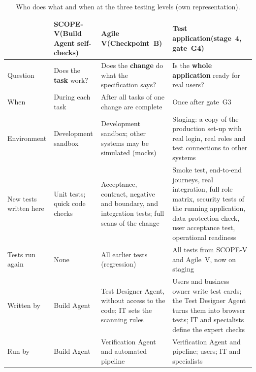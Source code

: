 \documentclass[10pt,a4paper]{article}
\begin{document}
\begin{table}[htbp]
    \centering
    \footnotesize
    \caption{Who does what and when at the three testing levels (own
    representation).}
    \label{tab:app-testing-who-when}
    \begin{tabularx}{\textwidth}{>{\raggedright\arraybackslash}p{2.4cm} Y Y Y}
    \toprule
    & \textbf{SCOPE-V}\newline (Build Agent self-checks)
    & \textbf{Agile V}\newline (Checkpoint~B)
    & \textbf{Test application}\newline (stage~4, gate~G4) \\
    \midrule
    Question
        & Does the \textbf{task} work?
        & Does the \textbf{change} do what the specification says?
        & Is the \textbf{whole application} ready for real users? \\
    \addlinespace
    When
        & During each task
        & After all tasks of one change are complete
        & Once after gate~G3\\
    \addlinespace
    Environment
        & Development sandbox
        & Development sandbox; other systems may be simulated (mocks)
        & Staging: a copy of the production set-up with real login, real
          roles and test connections to other systems \\
    \addlinespace
    New tests written here
        & Unit tests; quick code checks
        & Acceptance, contract, negative and boundary, and integration
          tests; full scans of the change
        & Smoke test, end-to-end journeys, real integration, full role
          matrix, security tests of the running application, data
          protection check, user acceptance test, operational readiness \\
    \addlinespace
    Tests run again
        & None
        & All earlier tests (regression)
        & All tests from SCOPE-V and Agile~V, now on staging \\
    \addlinespace
    Written by
        & Build Agent
        & Test Designer Agent, without access to the code; IT sets the
          scanning rules
        & Users and business owner write test cards; the Test Designer
          Agent turns them into browser tests; IT and specialists define
          the expert checks \\
    \addlinespace
    Run by
        & Build Agent
        & Verification Agent and automated pipeline
        & Verification Agent and pipeline; users; IT and specialists \\

\end{tabularx}
\end{table}
\end{document}
